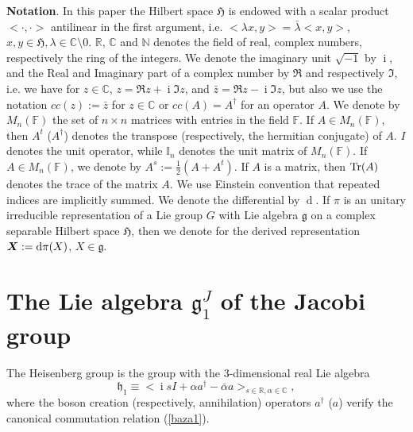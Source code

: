 \documentclass[12pt]{amsart}
\numberwithin{equation}{section}
\theoremstyle{definition}
\begin{document}
{\bf Notation}. In this paper the Hilbert space ${\ensuremath{{{\mathfrak{{H}}}}}}$ is endowed with
a scalar product $<\cdot,\cdot>$ 
antilinear in the first argument, i.e. $<\lambda x,y>=\bar{\lambda}<x,y>$,
$x,y\in{\ensuremath{{{\mathfrak{{H}}}}}},\lambda\in{\ensuremath{\mathbb{C}}}\setminus 0$. ${\ensuremath{\mathbb{R}}}$, ${\ensuremath{\mathbb{C}}}$  and ${\ensuremath{\mathbb{N}}}$ denotes the field of real,
complex numbers, respectively the ring of the integers.  We denote the imaginary unit
$\sqrt{-1}$ by ${\operatorname{i}}$, and the Real and Imaginary part of a complex
number by $\Re$ and respectively $\Im$, i.e. we have for $z\in{\ensuremath{\mathbb{C}}}$,
$z=\Re z+{\operatorname{i}} \Im z$, and $\bar{z}=\Re z-{\operatorname{i}} \Im z$, but also we use
the notation $cc(z):=\bar{z}$ for  $z\in{\ensuremath{\mathbb{C}}}$ or $cc(A)=A^{\dagger}$ for an
operator $A$.  We denote by $M_n({{\mathbb{{F}}}})$ the set of
$n\times n$ matrices with entries in the field ${{\mathbb{{F}}}}$. If $A\in
M_n({{\mathbb{{F}}}})$, then 
$A^t$ ($A^{\dagger}$) denotes the transpose (respectively, the
hermitian conjugate) of $A$. $I$  denotes the unit operator,  while
${{{\mathbb{I}}_n}}$ denotes the unit matrix  of $M_n({{\mathbb{{F}}}})$.  If $A\in
M_n({{\mathbb{{F}}}})$, we denote by $A^s:=\frac{1}{2}(A+A^t)$. If $A$ is a
matrix, then ${\ensuremath{{\mbox{\rm{Tr}}}}}(A)$ denotes the  trace of the matrix $A$.
We use Einstein convention that repeated indices are implicitly summed.
We
denote the differential by ${\operatorname{d}} $. If $\pi$ is an unitary irreducible
representation of a Lie group $G$ with Lie algebra ${{\mathfrak{{g}}}}$ on a
complex separable Hilbert space ${\ensuremath{{{\mathfrak{{H}}}}}}$, then we denote for the derived
representation ${{\mbox{\boldmath{${X}$}}}}:={\operatorname{d}} \pi(X)$, $X\in{{\mathfrak{{g}}}}$. 
\section{The Lie algebra ${{\mathfrak{{g}}}}^J_1$ of the Jacobi group}\label{sec1}

The Heisenberg   group  is the group with the
3-dimensional real  Lie algebra 
 \begin{equation}\label{nr0}{{\mathfrak{{h}}}}_1\equiv
<{\operatorname{i}} s I+\alpha a^{\dagger}-\bar{\alpha}a>_{s\in{\ensuremath{\mathbb{R}}} ,\alpha\in{\ensuremath{\mathbb{C}}}} ,\end{equation}
 where   the boson creation  (respectively, annihilation)
operators $a^{\dagger}$ ($a$)  
 verify the canonical commutation relation 
(\ref{baza1}).
\end{document}
